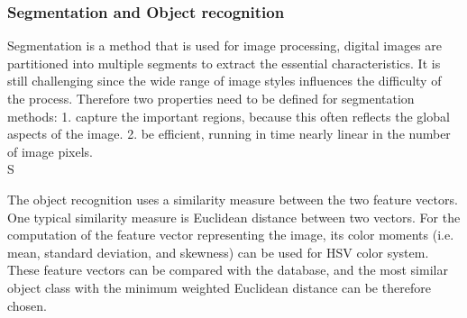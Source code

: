 \subsubsection{Segmentation and Object recognition}


Segmentation \cite{pedro} is a method that is used for image processing, digital images are partitioned into multiple segments to extract the essential characteristics. It is still challenging since the wide range of image styles influences the difficulty of the process. Therefore two properties need to be defined for segmentation methods: 1. capture the important regions, because this often reflects the global aspects of the image. 2. be efficient, running in time nearly linear in the number of image pixels.\\S %



The object recognition uses a similarity measure between the two feature vectors. One typical similarity measure is Euclidean distance between two vectors. For the computation of the feature vector representing the image, its color moments (i.e. mean, standard deviation, and skewness) can be used for HSV color system. These feature vectors can be compared with the database, and the most similar object class with the minimum weighted Euclidean distance can be therefore chosen.

